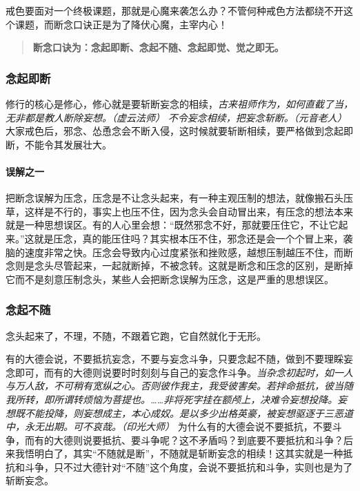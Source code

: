 戒色要面对一个终极课题，那就是心魔来袭怎么办？不管何种戒色方法都绕不开这个课题，而断念口诀正是为了降伏心魔，主宰内心！

\begin{quote}\bf
    断念口诀为：念起即断、念起不随、念起即觉、觉之即无。
\end{quote}

\subsubsection{念起即断}

修行的核心是修心，修心就是要斩断妄念的相续，\textit{古来祖师作为，如何直截了当，无非都是教人断除妄想。（虚云法师）} \textit{不令妄念相续，把妄念斩断。（元音老人）} 大家戒色后，邪念、怂恿念会不断入侵，这时候就要斩断相续，要严格做到念起即断，不能令其发展壮大。

\paragraph{误解之一}

把断念误解为压念，压念是不让念头起来，有一种主观压制的想法，就像搬石头压草，这样是不行的，事实上也压不住，因为念头会自动冒出来，有压念的想法本来就是一种思想误区。有的人心里会想：“既然邪念不好，那就要压住它，不让它起来。”这就是压念，真的能压住吗？其实根本压不住，邪念还是会一个个冒上来，袭脑的速度非常之快。压念会导致内心过度紧张和挫败感，越想压制越压不住，而断念则是念头尽管起来，一起就断掉，不被念转。这就是断念和压念的区别，是断掉它而不是刻意压制念头，某些人会把断念误解为压念，这是严重的思想误区。

\subsubsection{念起不随}

念头起来了，不理，不随，不跟着它跑，它自然就化于无形。

有的大德会说，不要抵抗妄念，不要与妄念斗争，只要念起不随，做到不要理睬妄念即可，而有的大德则说要时时刻刻与自己的妄念作斗争。\textit{当杂念初起时，如一人与万人敌，不可稍有宽纵之心。否则彼作我主，我受彼害矣。若拌命抵抗，彼当随我所转，即所谓转烦恼为菩提也。……非将死字挂在额颅上，决难令妄想投降。妄想既不能投降，则妄想成主，本心成奴。是以多少出格英豪，被妄想驱逐于三恶道中，永无出期。可不哀哉。（印光大师）} 为什么有的大德会说不要抵抗，不要斗争，而有的大德则说要抵抗、要斗争呢？这不矛盾吗？到底要不要抵抗和斗争？后来我悟明白了，其实“不随就是断”，不随就是斩断妄念的相续！这其实就是一种抵抗和斗争，只不过大德针对“不随”这个角度，会说不要抵抗和斗争，实则也是为了斩断妄念。

